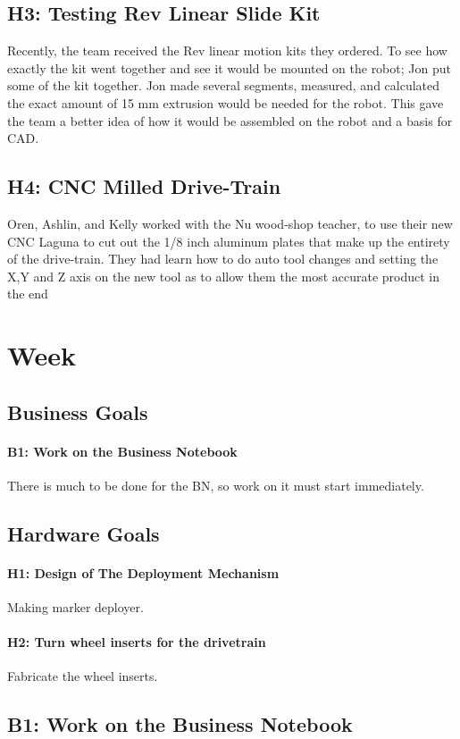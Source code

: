 \documentclass{article}
\begin{document}
\subsection{H3: Testing Rev Linear Slide Kit}

Recently, the team received the Rev linear motion kits they ordered. To see how exactly the kit went together and see it would be mounted on the robot; Jon put some of the kit together. Jon made several segments, measured, and calculated the exact amount of 15 mm extrusion would be needed for the robot. This gave the team a better idea of how it would be assembled on the robot and a basis for CAD.
\subsection{H4: CNC Milled Drive-Train }

Oren, Ashlin, and Kelly worked with the Nu wood-shop teacher, to use their new CNC Laguna to cut out the 1/8 inch aluminum plates that make up the entirety of the drive-train. They had learn how to do auto tool changes and setting the X,Y and Z axis on the new tool as to allow them the most accurate product in the end\clearpage \newpage \section{Week \thesection} 
\subsection{Business Goals}
\paragraph{B1: Work on the Business Notebook}
 There is much to be done for the BN, so work on it must start immediately.
\subsection{Hardware Goals}
\paragraph{H1: Design of The Deployment Mechanism}
 Making marker deployer.
\paragraph{H2: Turn wheel inserts for the drivetrain}
 Fabricate the wheel inserts.
\newpage
\subsection{B1: Work on the Business Notebook}
\end{document}
